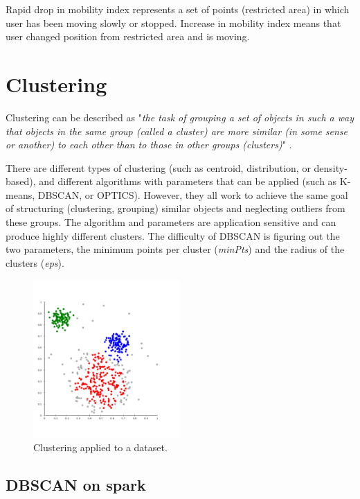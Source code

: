 Rapid drop in mobility index represents a set of points (restricted area) in which user has been moving slowly or stopped. Increase in mobility index means that user changed position from restricted area and is moving.

\section{Clustering}

Clustering can be described as "\textit{the task of grouping a set of objects in such a way that objects in the same group (called a cluster) are more similar (in some sense or another) to each other than to those in other groups (clusters)}" \cite{clustering}. 

There are different types of clustering (such as centroid, distribution, or density-based), and different algorithms with parameters that can be applied (such as K-means, DBSCAN, or OPTICS). However, they all work to achieve the same goal of structuring (clustering, grouping) similar objects and neglecting outliers from these groups. The algorithm and parameters are application sensitive and can produce highly different clusters. The difficulty of DBSCAN is figuring out the two parameters, the minimum points per cluster (\textit{minPts}) and the radius of the clusters (\textit{eps}).

\begin{figure}[!ht]
	\centering
	\includegraphics[width=0.5\textwidth]{images/clustering.png}
	\caption{ Clustering applied to a dataset. }
	\label{fig:clustering}
\end{figure} 

\subsection{DBSCAN on spark}

